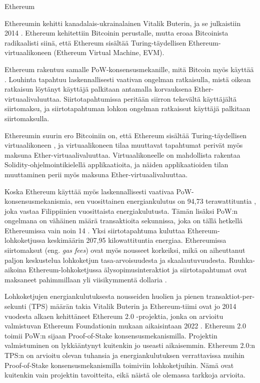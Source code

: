 \begin{subsection}{Ethereum\label{ethereum}}

Ethereumin kehitti kanadalais-ukrainalainen Vitalik Buterin, ja se julkaistiin 2014 \cite{buterin2017ethereum}. Ethereum kehitettiin Bitcoinin perustalle, mutta eroaa Bitcoinista radikaalisti siinä, että Ethereum sisältää Turing-täydellisen Ethereum-virtuaalikoneen (Ethereum Virtual Machine, EVM).

Ethereum rakentuu samalle PoW-konsensusmekanille, mitä Bitcoin myös käyttää \cite{buterin2017ethereum}. Louhinta tapahtuu laskennallisesti vaativan ongelman ratkaisulla, mistä oikean ratkaisun löytänyt käyttäjä palkitaan antamalla korvauksena Ether-virtuaalivaluuttaa. Siirtotapahtumissa peritään siirron tekevältä käyttäjältä siirtomaksu, ja siirtotapahtuman lohkon ongelman ratkaissut käyttäjä palkitaan siirtomaksulla.

Ethereumin suurin ero Bitcoiniin on, että Ethereum sisältää Turing-täydellisen virtuaalikoneen \cite{buterin2017ethereum}, ja virtuaalikoneen tilaa muuttavat tapahtumat perivät myös maksuna Ether-virtuaalivaluuttaa. Virtuaalikoneelle on mahdollista rakentaa Solidity-ohjelmointikielellä applikaatioita, ja näiden applikaatioiden tilan muuttaminen perii myös maksuna Ether-virtuaalivaluuttaa. 

Koska Ethereum käyttää myös laskennallisesti vaativaa PoW-konsensusmekanismia, sen vuosittainen energiankulutus on 94,73 terawattituntia \cite{ethereumenergy}, joka vastaa Filippiinien vuosittaista energiakulutusta. Tämän lisäksi PoW:n ongelmana on vähäinen määrä transaktioita sekunnissa, joka on tällä hetkellä Ethereumissa vain noin 14 \cite{ethereum-tps}. Yksi siirtotapahtuma kuluttaa Ethereum-lohkoketjussa keskimäärin 207,95 kilowattituntia energiaa. Ethereumissa siirtomaksut (eng. \textit{gas fees}) ovat myös nousseet korkeiksi, mikä on aiheuttanut paljon keskustelua lohkoketjun tasa-arvoisuudesta ja skaalautuvuudesta. Ruuhka-aikoina Ethereum-lohkoketjussa älysopimusinteraktiot ja siirtotapahtumat ovat maksaneet pahimmillaan yli viisikymmentä dollaria \cite{ethereum-fees}.

Lohkoketjujen energiankulutuksesta nousseiden huolien ja pienen transaktiot-per-sekunti (TPS) määrän takia Vitalik Buterin ja Ethereum-tiimi ovat jo 2014 vuodesta alkaen kehittäneet Ethereum 2.0 -projektia, jonka on arvioitu valmistuvan Ethereum Foundationin mukaan aikaisintaan 2022 \cite{eth2.0}. Ethereum 2.0 toimii PoW:n sijaan Proof-of-Stake konsensusmekanismilla. Projektin valmistuminen on  lykkääntynyt kuitenkin jo useasti aikaisemmin. Ethereum 2.0:n TPS:n on arvioitu olevan tuhansia ja energiankulutuksen verrattavissa muihin Proof-of-Stake konsensusmekanismilla toimiviin lohkoketjuihin. Nämä ovat kuitenkin vain projektin tavoitteita, eikä näistä ole olemassa tarkkoja arvioita.

\end{subsection}